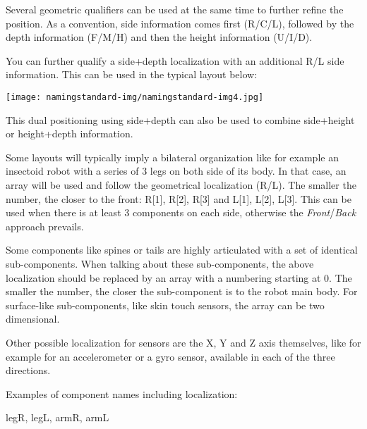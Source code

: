 \documentclass[a4paper]{article}
\begin{document}
{\par}

{
\textsf{Several geometric qualifiers can be used at the same time to
further refine the position. As a convention, side information comes
first (}R\textsf{/}C\textsf{/}L\textsf{), followed by the depth
information (}F\textsf{/}M\textsf{/}H\textsf{) and then the height
information (}U\textsf{/}I\textsf{/}D\textsf{). }}

{\sffamily
You can further qualify a side+depth localization with an additional R/L
side information. This can be used in the typical layout below:}

{\centering 
\texttt{[image: namingstandard-img/namingstandard-img4.jpg]}
\par}

{\sffamily
This dual positioning using side+depth can also be used to combine
side+height or height+depth information.}

{\sffamily
Some layouts will typically imply a bilateral organization like for
example an insectoid robot with a series of 3 legs on both side of its
body. In that case, an array will be used and follow the geometrical
localization (R/L). The smaller the number, the closer to the front:
R[1], R[2], R[3] and L[1], L[2], L[3]. This can be used when there is
at least 3 components on each side, otherwise the
\textit{Front}/\textit{Back} approach prevails.}

{\sffamily
Some components like spines or tails are highly articulated with a set
of identical sub-components. When talking about these sub-components,
the above localization should be replaced by an array with a numbering
starting at 0. The smaller the number, the closer the sub-component is
to the robot main body. For surface-like sub-components, like skin
touch sensors, the array can be two dimensional.}

{\sffamily
Other possible localization for sensors are the X, Y and Z axis
themselves, like for example for an accelerometer or a gyro sensor,
available in each of the three directions.}

{\sffamily
Examples of component names including localization:}

{
legR, legL, armR, armL}
\end{document}
